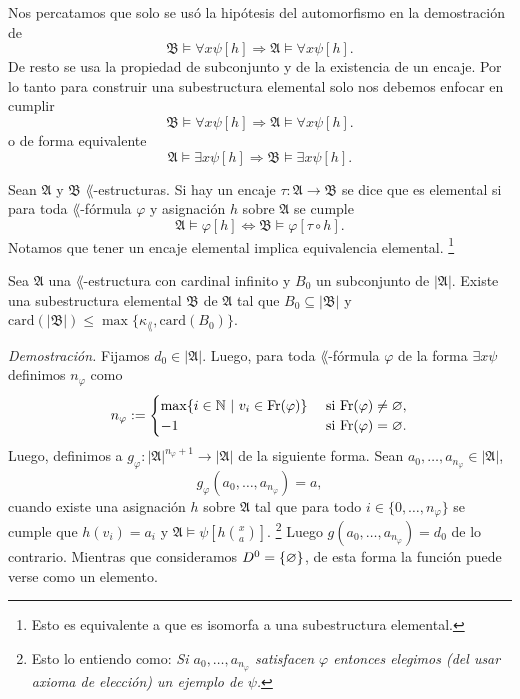 Nos percatamos que solo se us\'o la hip\'otesis del automorfismo en la demostraci\'on de
\[ \mathfrak{B} \models \forall x \psi [h] \Longrightarrow \mathfrak{A} \models \forall x \psi [h]. \]
De resto se usa la propiedad de subconjunto y de la existencia de un encaje.
Por lo tanto para construir una subestructura elemental solo nos debemos enfocar en cumplir
\[ \mathfrak{B} \models \forall x \psi [h] \Longrightarrow \mathfrak{A} \models \forall x \psi [h]. \]
o de forma equivalente 
\[ \mathfrak{A} \models \exists x \psi [h] \Longrightarrow \mathfrak{B} \models \exists x \psi [h]. \]
\begin{definition}
  Sean $\mathfrak{A}$ y $\mathfrak{B}$ $\lang$-estructuras.
  Si hay un encaje $\tau : \mathfrak{A} \to \mathfrak{B}$ se dice que es elemental si para toda $\lang$-f\'ormula $\varphi$ y asignaci\'on $h$ sobre $\mathfrak{A}$ se cumple
  \[ \mathfrak{A} \models \varphi [h] \iff \mathfrak{B} \models \varphi [\tau \circ h]. \]
  Notamos que tener un encaje elemental implica equivalencia elemental. 
  \footnote{Esto es equivalente a que es isomorfa a una subestructura elemental.}
\end{definition}
\newpage
\begin{theorem}
  Sea $\mathfrak{A}$ una $\lang$-estructura con cardinal infinito y $B_0$ un subconjunto de $|\mathfrak{A}|$. 
  Existe una subestructura elemental $\mathfrak{B}$ de $\mathfrak{A}$ tal que $B_0 \subseteq |\mathfrak{B}|$ y $\mathrm{card} (|\mathfrak{B}|) \leq \max \{ \kappa_\lang, \mathrm{card} (B_0) \}$.
\end{theorem} \hfill \break
\emph{Demostraci\'on.} \hfill \break
Fijamos $d_0 \in |\mathfrak{A}|$.
Luego, para toda $\lang$-f\'ormula $\varphi$ de la forma $\exists x \psi$ definimos $n_{\varphi}$ como
\[
  n_\varphi :=
  \begin{cases}
    \max \{ i \in \mathbb{N} \ | \ v_i \in \mathrm{Fr} (\varphi) \} &\text{ si } \mathrm{Fr} (\varphi) \neq \varnothing,\\
    -1 &\text{ si } \mathrm{Fr} (\varphi) = \varnothing.
  \end{cases}
\]
Luego, definimos a $g_\varphi : |\mathfrak{A}|^{n_\varphi + 1} \to |\mathfrak{A}|$ de la siguiente forma.
Sean $a_0, \dots, a_{n_\varphi} \in |\mathfrak{A}|$, 
\[ g_\varphi (a_0, \dots, a_{n_\varphi}) = a, \]
cuando existe una asignaci\'on $h$ sobre $\mathfrak{A}$ tal que para todo $i \in \{ 0, \dots, n_\varphi \}$ se cumple que $h(v_i) = a_i$ y $\mathfrak{A} \models \psi \left[ h \binom{x}{a} \right]$.
\footnote{Esto lo entiendo como: \emph{Si $a_0, \dots, a_{n_\varphi}$ satisfacen $\varphi$ entonces elegimos (del usar axioma de elecci\'on) un ejemplo de $\psi$.}}
Luego $g(a_0, \dots, a_{n_\varphi}) = d_0$ de lo contrario.
Mientras que consideramos $D^0 = \{ \varnothing \}$, de esta forma la funci\'on puede verse como un elemento.

